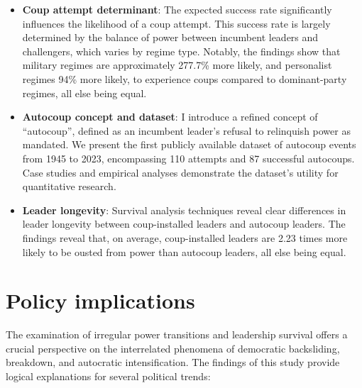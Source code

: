 \documentclass[
  12pt,
]{report}
\begin{document}
\begin{itemize}
\item
  \textbf{Coup attempt determinant}: The expected success rate
  significantly influences the likelihood of a coup attempt. This
  success rate is largely determined by the balance of power between
  incumbent leaders and challengers, which varies by regime type.
  Notably, the findings show that military regimes are approximately
  277.7\% more likely, and personalist regimes 94\% more likely, to
  experience coups compared to dominant-party regimes, all else being
  equal.
\item
  \textbf{Autocoup concept and dataset}: I introduce a refined concept
  of ``autocoup'', defined as an incumbent leader's refusal to
  relinquish power as mandated. We present the first publicly available
  dataset of autocoup events from 1945 to 2023, encompassing 110
  attempts and 87 successful autocoups. Case studies and empirical
  analyses demonstrate the dataset's utility for quantitative research.
\item
  \textbf{Leader longevity}: Survival analysis techniques reveal clear
  differences in leader longevity between coup-installed leaders and
  autocoup leaders. The findings reveal that, on average, coup-installed
  leaders are 2.23 times more likely to be ousted from power than
  autocoup leaders, all else being equal.
\end{itemize}

\section{Policy implications}\label{policy-implications-1}

The examination of irregular power transitions and leadership survival
offers a crucial perspective on the interrelated phenomena of democratic
backsliding, breakdown, and autocratic intensification. The findings of
this study provide logical explanations for several political trends:
\end{document}

